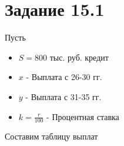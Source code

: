 \section*{Задание 15.1}





Пусть

\begin{itemize}
    \item $S = 800$ тыс. руб. кредит
    \item $x$ - Выплата с 26-30 гг.
    \item $y$ - Выплата с 31-35 гг.
    \item $k = \frac{r}{100}$ - Процентная ставка
\end{itemize}

Составим таблицу выплат


